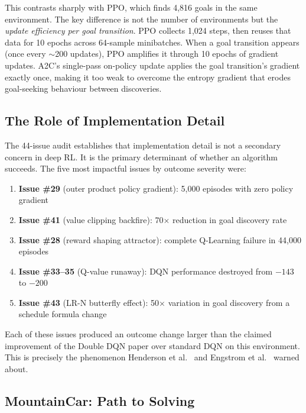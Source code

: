 \documentclass[a4paper,12pt]{article}
\begin{document}
This contrasts sharply with PPO, which finds 4,816 goals in the same environment. The key difference is not the number of environments but the \textit{update efficiency per goal transition}. PPO collects 1,024 steps, then reuses that data for 10 epochs across 64-sample minibatches. When a goal transition appears (once every $\sim$200 updates), PPO amplifies it through 10 epochs of gradient updates. A2C's single-pass on-policy update applies the goal transition's gradient exactly once, making it too weak to overcome the entropy gradient that erodes goal-seeking behaviour between discoveries.

\subsection{The Role of Implementation Detail}

The 44-issue audit establishes that implementation detail is not a secondary concern in deep RL. It is the primary determinant of whether an algorithm succeeds. The five most impactful issues by outcome severity were:

\begin{enumerate}
  \item \textbf{Issue \#29} (outer product policy gradient): 5,000 episodes with zero policy gradient
  \item \textbf{Issue \#41} (value clipping backfire): 70$\times$ reduction in goal discovery rate
  \item \textbf{Issue \#28} (reward shaping attractor): complete Q-Learning failure in 44,000 episodes
  \item \textbf{Issue \#33--35} (Q-value runaway): DQN performance destroyed from $-143$ to $-200$
  \item \textbf{Issue \#43} (LR-N butterfly effect): 50$\times$ variation in goal discovery from a schedule formula change

\end{enumerate}

Each of these issues produced an outcome change larger than the claimed improvement of the Double DQN paper over standard DQN on this environment. This is precisely the phenomenon Henderson et al.\ \cite{henderson2018deep} and Engstrom et al.\ \cite{engstrom2020implementation} warned about.

\subsection{MountainCar: Path to Solving}
\end{document}
